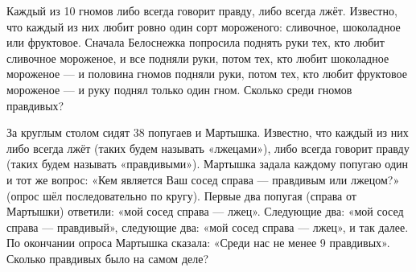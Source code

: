  Каждый из 10 гномов либо всегда говорит правду,
либо всегда лжёт. Известно, что каждый из них любит ровно один сорт мороженого: сливочное, шоколадное или фруктовое. Сначала Белоснежка попросила поднять руки тех, кто любит
сливочное мороженое, и все подняли руки, потом тех, кто любит шоколадное мороженое — и
половина гномов подняли руки, потом тех, кто любит фруктовое мороженое — и руку поднял
только один гном. Сколько среди гномов правдивых?



 За круглым столом сидят 38 попугаев и Мартышка. Известно,
что каждый из них либо всегда лжёт (таких будем называть «лжецами»), либо всегда говорит правду (таких будем называть «правдивыми»). Мартышка задала каждому попугаю один
и тот же вопрос: «Кем является Ваш сосед справа — правдивым или лжецом?» (опрос шёл
последовательно по кругу). Первые два попугая (справа от Мартышки) ответили: «мой сосед справа — лжец». Следующие два: «мой сосед справа — правдивый», следующие два: «мой
сосед справа — лжец», и так далее. По окончании опроса Мартышка сказала: «Среди нас не менее 9 правдивых». Сколько правдивых было на самом деле?

